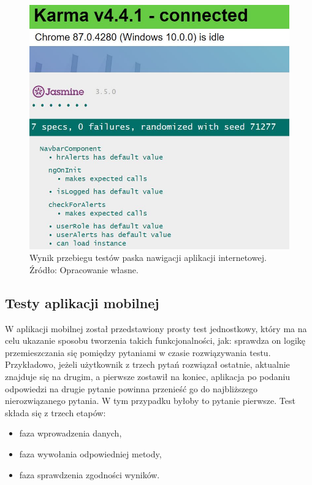 \documentclass[twoside]{projektInzynierskiMS}
\numberwithin{figure}{section}
\begin{document}
\begin{figure}[h!]
    \centering
    \includegraphics[scale=0.6]{images/testyFrontend.JPG}
    \caption{Wynik przebiegu testów paska nawigacji aplikacji internetowej. Źródło: Opracowanie własne.}
    \label{fig:testyFrontend}
\end{figure}
\newpage
\subsection{Testy aplikacji mobilnej}

W aplikacji mobilnej został przedstawiony prosty test jednostkowy, który ma na celu ukazanie sposobu tworzenia takich funkcjonalności, jak: sprawdza on logikę przemieszczania się pomiędzy pytaniami w czasie rozwiązywania testu. Przykładowo, jeżeli użytkownik z trzech pytań rozwiązał ostatnie, aktualnie znajduje się na drugim, a pierwsze zostawił na koniec, aplikacja po podaniu odpowiedzi na drugie pytanie powinna przenieść go do najbliższego nierozwiązanego pytania. W tym przypadku byłoby to pytanie pierwsze.\newline
Test składa się z trzech etapów:
\begin{itemize}
    \item faza wprowadzenia danych,
    \item faza wywołania odpowiedniej metody,
    \item faza sprawdzenia zgodności wyników.
\end{itemize}
\end{document}
